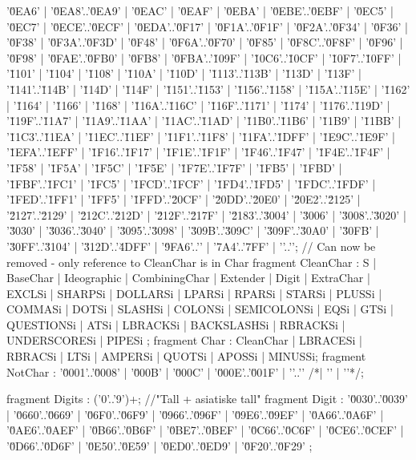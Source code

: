 '\u0EA6' | '\u0EA8'..'\u0EA9' | '\u0EAC' | '\u0EAF' | '\u0EBA' | '\u0EBE'..'\u0EBF' | '\u0EC5' | '\u0EC7' | '\u0ECE'..'\u0ECF' | '\u0EDA'..'\u0F17' | '\u0F1A'..'\u0F1F' | '\u0F2A'..'\u0F34' | '\u0F36' | '\u0F38' | '\u0F3A'..'\u0F3D' | '\u0F48' | '\u0F6A'..'\u0F70' | '\u0F85' | '\u0F8C'..'\u0F8F' | '\u0F96' | '\u0F98' | '\u0FAE'..'\u0FB0' | '\u0FB8' | '\u0FBA'..'\u109F' | '\u10C6'..'\u10CF' | '\u10F7'..'\u10FF' | '\u1101' | '\u1104' | '\u1108' | '\u110A' | '\u110D' | '\u1113'..'\u113B' | '\u113D' | '\u113F' | '\u1141'..'\u114B' | '\u114D' | '\u114F' | '\u1151'..'\u1153' | '\u1156'..'\u1158' | '\u115A'..'\u115E' | '\u1162' | '\u1164' | '\u1166' | '\u1168' | '\u116A'..'\u116C' | '\u116F'..'\u1171' | '\u1174' | '\u1176'..'\u119D' | '\u119F'..'\u11A7' | '\u11A9'..'\u11AA' | '\u11AC'..'\u11AD' | '\u11B0'..'\u11B6' | '\u11B9' | '\u11BB' | '\u11C3'..'\u11EA' | '\u11EC'..'\u11EF' | '\u11F1'..'\u11F8' | '\u11FA'..'\u1DFF' | '\u1E9C'..'\u1E9F' | '\u1EFA'..'\u1EFF' | '\u1F16'..'\u1F17' | '\u1F1E'..'\u1F1F' | '\u1F46'..'\u1F47' | '\u1F4E'..'\u1F4F' | '\u1F58' | '\u1F5A' | '\u1F5C' | '\u1F5E' | '\u1F7E'..'\u1F7F' | '\u1FB5' | '\u1FBD' | '\u1FBF'..'\u1FC1' | '\u1FC5' | '\u1FCD'..'\u1FCF' | '\u1FD4'..'\u1FD5' | '\u1FDC'..'\u1FDF' | '\u1FED'..'\u1FF1' | '\u1FF5' | '\u1FFD'..'\u20CF' | '\u20DD'..'\u20E0' | '\u20E2'..'\u2125' | '\u2127'..'\u2129' | '\u212C'..'\u212D' | '\u212F'..'\u217F' | '\u2183'..'\u3004' | '\u3006' | '\u3008'..'\u3020' | '\u3030' | '\u3036'..'\u3040' | '\u3095'..'\u3098' | '\u309B'..'\u309C' | '\u309F'..'\u30A0' | '\u30FB' | '\u30FF'..'\u3104' | '\u312D'..'\u4DFF' | '\u9FA6'..'\uABFF' | '\uD7A4'..'\uD7FF' | ''..'\uFFFD';
// Can now be removed - only reference to CleanChar is in Char
fragment CleanChar            : S | BaseChar | Ideographic | CombiningChar | Extender | Digit | ExtraChar 
                    | EXCLSi | SHARPSi | DOLLARSi | LPARSi | RPARSi | STARSi | PLUSSi | COMMASi 
                    | DOTSi | SLASHSi | COLONSi | SEMICOLONSi | EQSi | GTSi | QUESTIONSi | ATSi 
                    | LBRACKSi | BACKSLASHSi | RBRACKSi  | UNDERSCORESi | PIPESi
                    ;
fragment Char              : CleanChar | LBRACESi | RBRACSi | LTSi | AMPERSi | QUOTSi | APOSSi | MINUSSi;
fragment NotChar            : '\u0001'..'\u0008' | '\u000B' | '\u000C' | '\u000E'..'\u001F' | ''..'\uDFFF' 
                    /*| '\uFFFE' | '\uFFFF'*/;
                     

fragment Digits                    : ('0'..'9')+;
//"Tall + asiatiske tall" 
fragment Digit                     : '\u0030'..'\u0039' | '\u0660'..'\u0669' | '\u06F0'..'\u06F9' | '\u0966'..'\u096F' | '\u09E6'..'\u09EF' | '\u0A66'..'\u0A6F' | '\u0AE6'..'\u0AEF' | '\u0B66'..'\u0B6F' | '\u0BE7'..'\u0BEF' | '\u0C66'..'\u0C6F' | '\u0CE6'..'\u0CEF' | '\u0D66'..'\u0D6F' | '\u0E50'..'\u0E59' | '\u0ED0'..'\u0ED9' | '\u0F20'..'\u0F29' ;

